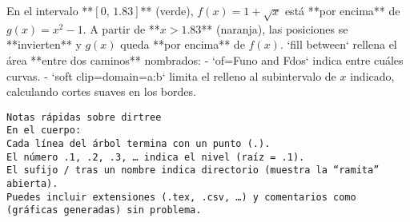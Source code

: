 \documentclass[12pt,letterpaper]{article}
\begin{document}
	En el intervalo **$[0,\,1.83]$** (verde), \(f(x)=1+\sqrt{x}\) está **por encima** de \(g(x)=x^2-1\).  
	A partir de **$x>1.83$** (naranja), las posiciones se **invierten** y \(g(x)\) queda **por encima** de \(f(x)\).  
	`fill between` rellena el área **entre dos caminos** nombrados:  
	- `of=Funo and Fdos` indica entre cuáles curvas.  
	- `soft clip={domain=a:b}` limita el relleno al subintervalo de \(x\) indicado, calculando cortes suaves en los bordes.  \\[25mm]


\begin{verbatim}
Notas rápidas sobre dirtree
En el cuerpo: 
Cada línea del árbol termina con un punto (.).
El número .1, .2, .3, … indica el nivel (raíz = .1).
El sufijo / tras un nombre indica directorio (muestra la “ramita” abierta).
Puedes incluir extensiones (.tex, .csv, …) y comentarios como (gráficas generadas) sin problema.
\end{verbatim}

\end{document}
